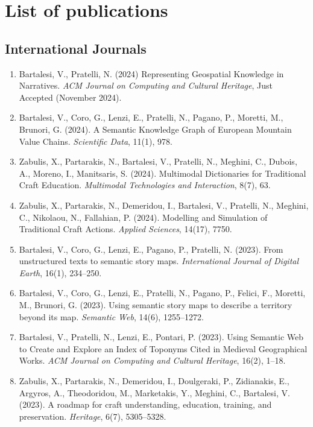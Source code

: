 \chapter*{List of publications}

\section*{International Journals}
\begin{enumerate}
    \item Bartalesi, V., Pratelli, N. (2024) Representing Geospatial Knowledge in Narratives.  \emph{ACM Journal on Computing and Cultural Heritage}, Just Accepted (November 2024).
    \item Bartalesi, V., Coro, G., Lenzi, E., Pratelli, N., Pagano, P., Moretti, M., Brunori, G. (2024). A Semantic Knowledge Graph of European Mountain Value Chains. \emph{Scientific Data}, 11(1), 978.
    \item Zabulis, X., Partarakis, N., Bartalesi, V., Pratelli, N., Meghini, C., Dubois, A., Moreno, I., Manitsaris, S. (2024). Multimodal Dictionaries for Traditional Craft Education. \emph{Multimodal Technologies and Interaction}, 8(7), 63.
    \item Zabulis, X., Partarakis, N., Demeridou, I., Bartalesi, V., Pratelli, N., Meghini, C., Nikolaou, N.,  Fallahian, P. (2024). Modelling and Simulation of Traditional Craft Actions. \emph{Applied Sciences}, 14(17), 7750.
    \item Bartalesi, V., Coro, G., Lenzi, E., Pagano, P., Pratelli, N. (2023). From unstructured texts to semantic story maps. \emph{International Journal of Digital Earth}, 16(1), 234–250.
    \item Bartalesi, V., Coro, G., Lenzi, E., Pratelli, N., Pagano, P., Felici, F., Moretti, M., Brunori, G. (2023). Using semantic story maps to describe a territory beyond its map. \emph{Semantic Web}, 14(6), 1255–1272.
    \item Bartalesi, V., Pratelli, N., Lenzi, E., Pontari, P. (2023). Using Semantic Web to Create and Explore an Index of Toponyms Cited in Medieval Geographical Works. \emph{ACM Journal on Computing and Cultural Heritage}, 16(2), 1–18.
    \item Zabulis, X., Partarakis, N., Demeridou, I., Doulgeraki, P., Zidianakis, E., Argyros, A., Theodoridou, M., Marketakis, Y., Meghini, C., Bartalesi, V. (2023). A roadmap for craft understanding, education, training, and preservation. \emph{Heritage}, 6(7), 5305–5328.

\end{enumerate}
